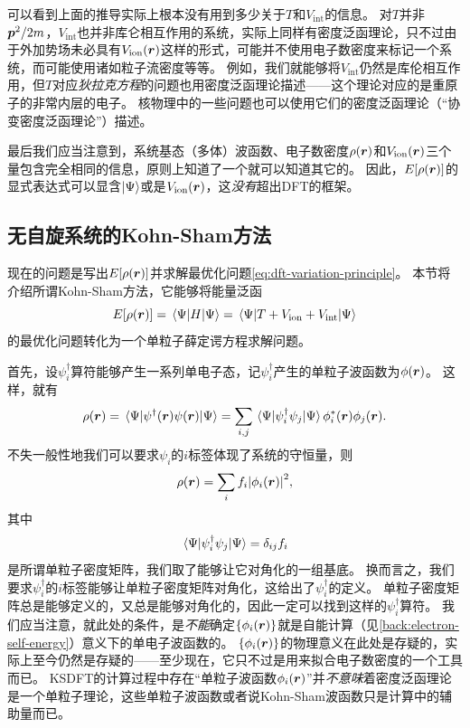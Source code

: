 可以看到上面的推导实际上根本没有用到多少关于$T$和$V_\text{int}$的信息。
对$T$并非$\vb*{p}^2 / 2m$，$V_\text{int}$也并非库仑相互作用的系统，实际上同样有密度泛函理论，只不过由于外加势场未必具有$V_\text{ion}(\vb*{r})$这样的形式，可能并不使用电子数密度来标记一个系统，而可能使用诸如粒子流密度等等。
例如，我们就能够将$V_\text{int}$仍然是库伦相互作用，但$T$对应\emph{狄拉克方程}的问题也用密度泛函理论描述——这个理论对应的是重原子的非常内层的电子。
核物理中的一些问题也可以使用它们的密度泛函理论（“协变密度泛函理论”）描述。

最后我们应当注意到，系统基态（多体）波函数、电子数密度$\rho(\vb*{r})$和$V_\text{ion}(\vb*{r})$三个量包含完全相同的信息，原则上知道了一个就可以知道其它的。
因此，$E[\rho(\vb*{r})]$的显式表达式可以显含$\ket{\Psi}$或是$V_\text{ion}(\vb*{r})$，这\emph{没有}超出DFT的框架。

\subsection{无自旋系统的Kohn-Sham方法}\label{sec:kohn-sham-no-spin}


现在的问题是写出$E[\rho(\vb*{r})]$并求解最优化问题\eqref{eq:dft-variation-principle}。
本节将介绍所谓Kohn-Sham方法，它能够将能量泛函
\begin{equation}
    E[\rho(\vb*{r})] = \mel{\Psi}{{H}}{\Psi} = \mel{\Psi}{{T} + {V}_\text{ion} + {V}_\text{int}}{\Psi}
\end{equation}
的最优化问题转化为一个单粒子薛定谔方程求解问题。

首先，设$\psi^\dagger_i$算符能够产生一系列单电子态，记${\psi}_i^\dagger$产生的单粒子波函数为$\phi(\vb*{r})$。
这样，就有
\[
    \rho(\vb*{r}) = \mel{\Psi}{\psi^\dagger(\vb*{r}) \psi(\vb*{r})}{\Psi} = \sum_{i, j} \mel{\Psi}{\psi^\dagger_i \psi_j}{\Psi} \phi_i^*(\vb*{r}) \phi_j(\vb*{r}).
\]
不失一般性地我们可以要求$\psi_i$的$i$标签体现了系统的守恒量，则
\begin{equation}
    \rho(\vb*{r}) = \sum_{i} f_i \abs{\phi_i(\vb*{r})}^2,
    \label{eq:kohn-sham-density}
\end{equation}
其中
\begin{equation}
    \mel{\Psi}{\psi^\dagger_i \psi_j}{\Psi} = \delta_{ij} f_i
\end{equation}
是所谓单粒子密度矩阵，我们取了能够让它对角化的一组基底。
换而言之，我们要求$\psi_i^\dagger$的$i$标签能够让单粒子密度矩阵对角化，这给出了$\psi_i^\dagger$的定义。
单粒子密度矩阵总是能够定义的，又总是能够对角化的，因此一定可以找到这样的$\psi_i^\dagger$算符。
我们应当注意，就此处的条件，是\emph{不能}确定$\{\phi_i (\vb*{r})\}$就是自能计算（见\autoref{back:electron-self-energy}）意义下的单电子波函数的。
$\{\phi_i (\vb*{r})\}$的物理意义在此处是存疑的，实际上至今仍然是存疑的——至少现在，它只不过是用来拟合电子数密度的一个工具而已。
KSDFT的计算过程中存在“单粒子波函数$\phi_i(\vb*{r})$”并\emph{不意味}着密度泛函理论是一个单粒子理论，这些单粒子波函数或者说Kohn-Sham波函数只是计算中的辅助量而已。

